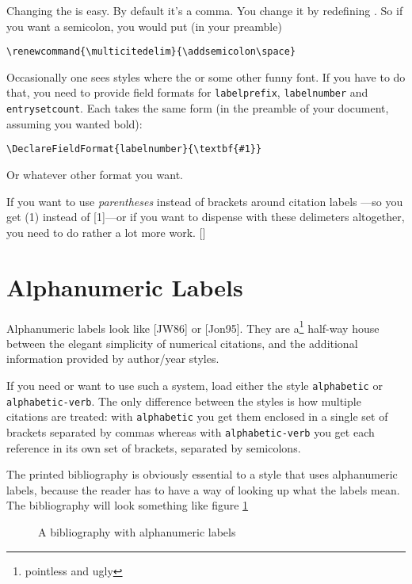 Changing the  is
easy. By default it's a comma. You change it by redefining
. So if you want a semicolon, you would put (in
your preamble)
\begin{center}
\verb|\renewcommand{\multicitedelim}{\addsemicolon\space}|
\end{center}

Occasionally one sees styles where the  or some other
funny font. If you have to do that, you need to provide field formats
for \verb|labelprefix|, \verb|labelnumber| and
\verb|entrysetcount|. Each takes the same form (in the preamble of
your document, assuming you wanted bold):
\begin{center}
\verb|\DeclareFieldFormat{labelnumber}{\textbf{#1}}|
\end{center}
Or whatever other format you want.


If you want to use \emph{parentheses} instead of brackets around citation labels
---so you get (1) instead of [1]---or if you want to dispense with
these delimeters altogether, you need to do rather a lot more
work. []

\section{Alphanumeric Labels}

Alphanumeric labels look like [JW86] or [Jon95]. They are a\footnote{pointless and ugly} half-way house between the elegant
simplicity of numerical citations, and the additional information
provided by author/year styles.

If you need or want to use such a system, load either the style
\verb|alphabetic| or \verb|alphabetic-verb|. The only difference
between the styles is how multiple citations are treated: with
\verb|alphabetic| you get them enclosed in a single set of
brackets
separated by commas
whereas with \verb|alphabetic-verb| you get each reference in its own
set of brackets, separated by semicolons.

The printed bibliography is obviously essential to a style that uses
alphanumeric labels, because the reader has to have a way of looking
up what the labels mean. The bibliography will look something like
figure \ref{example:bibliography:alphabetic}

\begin{figure}
\caption{A bibliography with alphanumeric
  labels\label{example:bibliography:alphabetic}}
\end{figure}

